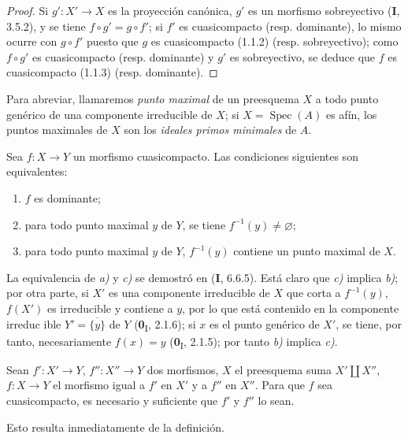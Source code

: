 \begin{proof}
Si $g':X'\to X$ es la proyección canónica, $g'$ es un morfismo sobreyectivo
(\textbf{I}, 3.5.2), y se tiene $f\circ g'=g\circ f'$; si $f'$ es cuasicompacto
(resp. dominante), lo mismo ocurre con $g\circ f'$ puesto que $g$ es
cuasicompacto (1.1.2) (resp. sobreyectivo); como $f\circ g'$ es cuasicompacto
(resp. dominante) y $g'$ es sobreyectivo, se deduce que $f$ es
cuasicompacto (1.1.3) (resp. dominante).
\end{proof}

Para abreviar, llamaremos \emph{punto maximal} de un preesquema $X$ a todo
punto genérico de una componente irreducible de $X$; si
$X=\operatorname{Spec}(A)$ es afín, los puntos maximales de $X$ son los
\emph{ideales primos minimales} de $A$.

\begin{proposition}[1.1.5]
\label{IV.1.1.5-fr}
Sea $f:X\to Y$ un morfismo cuasicompacto. Las condiciones siguientes son
equivalentes:
\begin{enumerate}
  \item[\textup{a)}] $f$ es dominante;
  \item[\textup{b)}] para todo punto maximal $y$ de $Y$, se tiene
  $f^{-1}(y)\neq\varnothing$;
  \item[\textup{c)}] para todo punto maximal $y$ de $Y$, $f^{-1}(y)$ contiene un punto
  maximal de $X$.
\end{enumerate}
\end{proposition}

La equivalencia de \emph{a)} y \emph{c)} se demostró en (\textbf{I}, 6.6.5). Está
claro que \emph{c)} implica \emph{b)}; por otra parte, si $X'$ es una
componente irreducible de $X$ que corta a $f^{-1}(y)$, $f(X')$ es
irreducible y contiene a $y$, por lo que está contenido en la componente irreduc%
ible
$Y'=\overline{\{y\}}$ de $Y$ (\textbf{0}\textsubscript{I}, 2.1.6); si $x$ es el
punto genérico de $X'$, se tiene, por tanto, necesariamente $f(x)=y$
(\textbf{0}\textsubscript{I}, 2.1.5); por tanto \emph{b)} implica \emph{c)}.

\begin{proposition}[1.1.6]
\label{IV.1.1.6-fr}
Sean $f':X'\to Y$, $f'':X''\to Y$ dos morfismos, $X$ el preesquema suma
$X'\amalg X''$, $f:X\to Y$ el morfismo igual a $f'$ en $X'$ y a $f''$
en $X''$. Para que $f$ sea cuasicompacto, es necesario y suficiente que $f'$ y
$f''$ lo sean.
\end{proposition}

Esto resulta inmediatamente de la definición.

